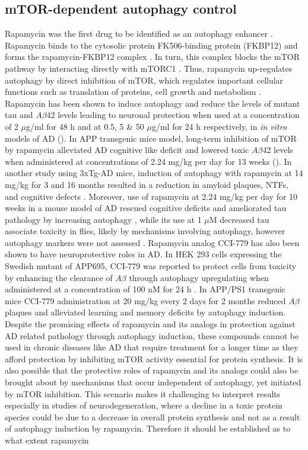 \subsection{mTOR-dependent autophagy control}
Rapamycin was the first drug to be identified as an autophagy enhancer \citep{Blommaart1995,Noda1998}. Rapamycin binds to the cytosolic protein FK506-binding protein (FKBP12) and forms the rapamycin-FKBP12 complex \citep{Cardenas1995}. In turn, this complex blocks the mTOR pathway by interacting directly with mTORC1 \citep{Cardenas1995,Lorenz1995}. Thus, rapamycin up-regulates autophagy by direct inhibition of mTOR, which regulates important cellular functions such as translation of proteins, cell growth and metabolism \citep{Laplante2012,Polak2009}. Rapamycin has been shown to induce autophagy and reduce the levels of mutant tau and $A\beta$42 levels leading to neuronal protection when used at a concentration of 2 $\mu$g/ml for 48 h \citep{Berger2006} and at 0.5, 5 \& 50 $\mu$g/ml for 24 h \citep{Caccamo2010} respectively, in \textit{in vitro} models of AD (). In APP transgenic mice model, long-term inhibition of mTOR by rapamycin alleviated AD cognitive like deficit and lowered toxic $A\beta$42 levels when administered at concentrations of 2.24 mg/kg per day for 13 weeks \citep{Spilman2010} (). In another study using 3xTg-AD mice, induction of autophagy with rapamycin at 14 mg/kg for 3 and 16 months resulted in a reduction in amyloid plaques, NTFs, and cognitive defects  \citep{Majumder2011}. Moreover, use of rapamycin at 2.24 mg/kg per day for 10 weeks in a mouse model of AD rescued cognitive deficits and ameliorated tau pathology by increasing autophagy \citep{Caccamo2010}, while its use at 1 $\mu$M decreased tau associate toxicity in flies, likely by mechanisms involving autophagy, however autophagy markers were not assessed \citep{Berger2006}. Rapamycin analog CCI-779 has also been shown to have neuroprotective roles in AD. In HEK 293 cells expressing the Swedish mutant of APP695, CCI-779 was reported to protect cells from toxicity by enhancing the clearance of $A\beta$  through autophagy upregulating when administered at a concentration of 100 nM for 24 h \citep{Jiang2014a}. In APP/PS1 transgenic mice CCI-779 administration at 20 mg/kg every 2 days for 2 months reduced $A\beta$ plaques and alleviated learning and memory deficits \citep{Jiang2014a} by autophagy induction. Despite the promising effects of rapamycin and its analogs in protection against AD related pathology through autophagy induction, these compounds cannot be used in chronic diseases like AD that require treatment for a longer time as they afford protection  by inhibiting mTOR activity essential for protein synthesis. It is also possible that the protective roles of rapamycin and its analogs could also be brought about by mechanisms that occur independent of autophagy, yet initiated by mTOR inhibition. This scenario makes it challenging to interpret results especially in studies of neurodegeneration, where a decline in a toxic protein species could be due to a decrease in overall protein synthesis and not as a result of autophagy induction by rapamycin. Therefore it should be established as to what extent rapamycin 